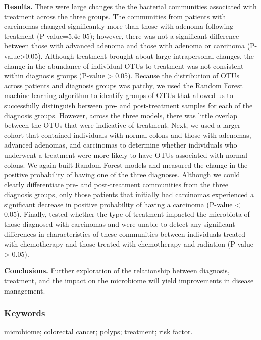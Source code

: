 \documentclass[12pt,]{article}
\begin{document}
\textbf{Results.} There were large changes the the bacterial communities
associated with treatment across the three groups. The communities from
patients with carcinomas changed significantly more than those with
adenoma following treatment (P-value=5.4e-05); however, there was not a
significant difference between those with advanced adenoma and those
with adenoma or carcinoma (P-value\textgreater{}0.05). Although
treatment brought about large intrapersonal changes, the change in the
abundance of individual OTUs to treatment was not consistent within
diagnosis groups (P-value \textgreater{} 0.05). Because the distribution
of OTUs across patients and diagnosis groups was patchy, we used the
Random Forest machine learning algorithm to identify groups of OTUs that
allowed us to successfully distinguish between pre- and post-treatment
samples for each of the diagnosis groups. However, across the three
models, there was little overlap between the OTUs that were indicative
of treatment. Next, we used a larger cohort that contained individuals
with normal colons and those with adenomas, advanced adenomas, and
carcinomas to determine whether individuals who underwent a treatment
were more likely to have OTUs associated with normal colons. We again
built Random Forest models and measured the change in the positive
probability of having one of the three diagnoses. Although we could
clearly differentiate pre- and post-treatment communities from the three
diagnosis groups, only those patients that initially had carcinomas
experienced a significant decrease in positive probability of having a
carcinoma (P-value \textless{} 0.05). Finally, tested whether the type
of treatment impacted the microbiota of those diagnosed with carcinomas
and were unable to detect any significant differences in characteristics
of these communities between individuals treated with chemotherapy and
those treated with chemotherapy and radiation (P-value \textgreater{}
0.05).

\textbf{Conclusions.} Further exploration of the relationship between
diagnosis, treatment, and the impact on the microbiome will yield
improvements in disease management.

\newpage

\subsubsection{Keywords}\label{keywords}

microbiome; colorectal cancer; polyps; treatment; risk factor.
\end{document}
